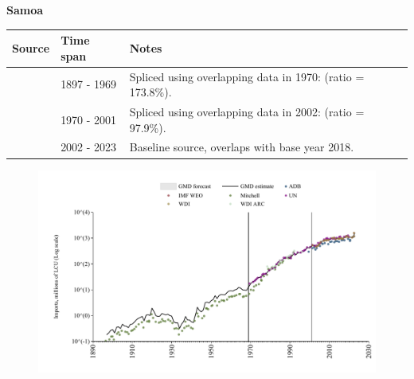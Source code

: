 \documentclass[12pt,a4paper,landscape]{article}
\begin{document}
\begin{adjustbox}{max totalsize={\paperwidth}{\paperheight},center}
\begin{minipage}[t][\textheight][t]{\textwidth}
\vspace*{0.5cm}
{}
\begin{center}
{\Large\bfseries Samoa}
\end{center}
\vspace{0.5cm}
\begin{table}[H]
\centering
\small
\begin{tabular}{|l|l|l|}
\hline
\textbf{Source} & \textbf{Time span} & \textbf{Notes} \\
\hline
\rowcolor{white}\cite{Mitchell}& 1897 - 1969 &Spliced using overlapping data in 1970: (ratio = 173.8\%).\\
\rowcolor{lightgray}\cite{UN}& 1970 - 2001 &Spliced using overlapping data in 2002: (ratio = 97.9\%).\\
\rowcolor{white}\cite{WDI}& 2002 - 2023 &Baseline source, overlaps with base year 2018.\\
\hline
\end{tabular}
\end{table}
\begin{figure}[H]
\centering
\includegraphics[width=\textwidth,height=0.6\textheight,keepaspectratio]{graphs/WSM_imports.pdf}
\end{figure}
\end{minipage}
\end{adjustbox}
\end{document}
